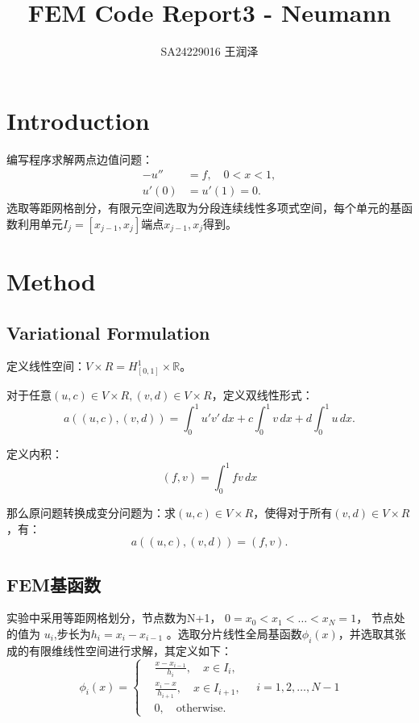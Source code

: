 \documentclass[11pt]{ctexart}
\title{FEM Code Report3 - Neumann}
\author{SA24229016 王润泽}
\begin{document}
\maketitle

\section{Introduction}
编写程序求解两点边值问题：
\begin{equation}
     \begin{aligned}
          -u'' &= f, \quad 0 < x < 1, \\
          u'(0) &= u'(1) = 0.
     \end{aligned}
\end{equation}
选取等距网格剖分，有限元空间选取为分段连续线性多项式空间，每个单元的基函数利用单元$ I_j = [x_{j-1},x_j] $端点$x_{j-1}, x_j$得到。

\section{Method}

\subsection{Variational Formulation}

定义线性空间：$ V\times R = H^1_{[0,1]}\times \mathbb{R} $。

对于任意$ (u,c)\in V\times R , (v,d)\in V\times R $，定义双线性形式：
\begin{equation*}
     a((u,c),(v,d)) = \int_0^1 u'v' \,dx + c\int_0^1 v \,dx + d\int_0^1 u \,dx.
\end{equation*}

定义内积：
\begin{equation*}
     (f,v) = \int_0^1 f v \,dx 
\end{equation*}

那么原问题转换成变分问题为：求$ (u,c)\in V\times R $，使得对于所有$ (v,d)\in V\times R $，有：
\begin{equation}
     a((u,c),(v,d)) = (f,v).
\end{equation}

\subsection{FEM基函数}
实验中采用等距网格划分，节点数为N+1， $ 0=x_0<x_1<\dots<x_{N}=1 $， 节点处的值为 $ u_i $,步长为$h_i = x_{i}-x_{i-1}$ 。选取分片线性全局基函数$ \phi_i(x) $，并选取其张成的有限维线性空间进行求解，其定义如下：
\begin{equation}
  \phi_i(x) = \left\{
       \begin{aligned}
            &\frac{x-x_{i-1}}{h_i}, \quad x \in I_{i}, \\
            &\frac{x_i-x}{h_{i+1}}, \quad x \in I_{i+1}, \\
            &0, \quad \text{otherwise}.
       \end{aligned}
  \right.
  \quad i=1,2,\dots,N-1
\end{equation}
\end{document}
